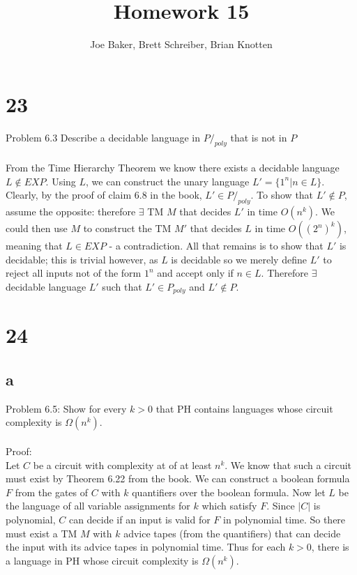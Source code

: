 \documentclass[letterpaper,notitlepage,twoside]{article}
\begin{document}
\title{Homework 15}
\author{Joe Baker, Brett Schreiber, Brian Knotten}
\maketitle

\section*{23}
Problem 6.3 Describe a decidable language in $P/_{poly}$ that is not in $P$
\\\\
From the Time Hierarchy Theorem we know there exists a decidable language $L \notin EXP$. Using $L$, we can construct the unary language $L' = \{1^{n} | n \in L\}$. Clearly, by the proof of claim 6.8 in the book, $L' \in P/_{poly}$. To show that $L' \notin P$, assume the opposite: therefore $\exists$ TM $M$ that decides $L'$ in time $O(n^{k})$. We could then use $M$ to construct the TM $M'$ that decides $L$ in time $O((2^{n})^{k})$, meaning that $L \in EXP$ - a contradiction. All that remains is to show that $L'$ is decidable; this is trivial however, as $L$ is decidable so we merely define $L'$ to reject all inputs not of the form $1^{n}$ and accept only if $n \in L$. Therefore $\exists$ decidable language $L'$ such that $L' \in P_{poly}$ and $L' \notin P$.

\section*{24}

\subsection*{a}
Problem 6.5: Show for every $k > 0$ that PH contains languages whose circuit complexity is $\Omega\left(n^k\right)$.
\\\\
Proof:
\\
Let $C$ be a circuit with complexity at of at least $n^k$. We know that such a circuit must exist by Theorem 6.22 from the book. We can construct a boolean formula $F$ from the gates of $C$ with $k$ quantifiers over the boolean formula. Now let $L$ be the language of all variable assignments for $k$ which satisfy $F$. Since $\left| C \right|$ is polynomial, $C$ can decide if an input is valid for $F$ in polynomial time. So there must exist a TM $M$ with $k$ advice tapes (from the quantifiers) that can decide the input with its advice tapes in polynomial time. Thus for each $k > 0$, there is a language in PH whose circuit complexity is $\Omega\left(n^k\right)$.
\end{document}
